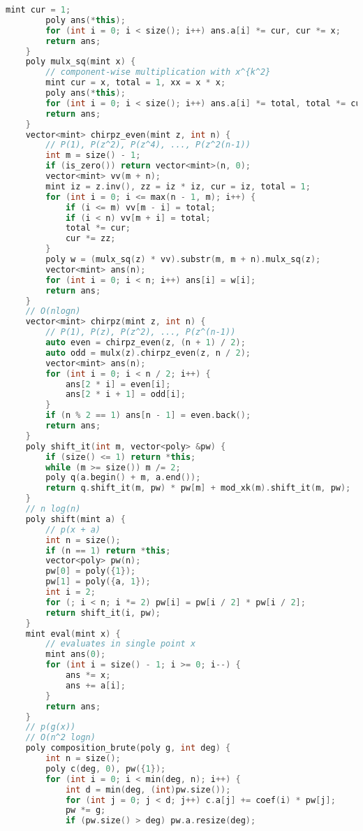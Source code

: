 \documentclass[10pt, a4paper, oneside]{book}
\begin{document}
\begin{lstlisting}[language=C++]
        mint cur = 1;
        poly ans(*this);
        for (int i = 0; i < size(); i++) ans.a[i] *= cur, cur *= x;
        return ans;
    }
    poly mulx_sq(mint x) {
        // component-wise multiplication with x^{k^2}
        mint cur = x, total = 1, xx = x * x;
        poly ans(*this);
        for (int i = 0; i < size(); i++) ans.a[i] *= total, total *= cur, cur *= xx;
        return ans;
    }
    vector<mint> chirpz_even(mint z, int n) {
        // P(1), P(z^2), P(z^4), ..., P(z^2(n-1))
        int m = size() - 1;
        if (is_zero()) return vector<mint>(n, 0);
        vector<mint> vv(m + n);
        mint iz = z.inv(), zz = iz * iz, cur = iz, total = 1;
        for (int i = 0; i <= max(n - 1, m); i++) {
            if (i <= m) vv[m - i] = total;
            if (i < n) vv[m + i] = total;
            total *= cur;
            cur *= zz;
        }
        poly w = (mulx_sq(z) * vv).substr(m, m + n).mulx_sq(z);
        vector<mint> ans(n);
        for (int i = 0; i < n; i++) ans[i] = w[i];
        return ans;
    }
    // O(nlogn)
    vector<mint> chirpz(mint z, int n) {
        // P(1), P(z), P(z^2), ..., P(z^(n-1))
        auto even = chirpz_even(z, (n + 1) / 2);
        auto odd = mulx(z).chirpz_even(z, n / 2);
        vector<mint> ans(n);
        for (int i = 0; i < n / 2; i++) {
            ans[2 * i] = even[i];
            ans[2 * i + 1] = odd[i];
        }
        if (n % 2 == 1) ans[n - 1] = even.back();
        return ans;
    }
    poly shift_it(int m, vector<poly> &pw) {
        if (size() <= 1) return *this;
        while (m >= size()) m /= 2;
        poly q(a.begin() + m, a.end());
        return q.shift_it(m, pw) * pw[m] + mod_xk(m).shift_it(m, pw);
    }
    // n log(n)
    poly shift(mint a) {
        // p(x + a)
        int n = size();
        if (n == 1) return *this;
        vector<poly> pw(n);
        pw[0] = poly({1});
        pw[1] = poly({a, 1});
        int i = 2;
        for (; i < n; i *= 2) pw[i] = pw[i / 2] * pw[i / 2];
        return shift_it(i, pw);
    }
    mint eval(mint x) {
        // evaluates in single point x
        mint ans(0);
        for (int i = size() - 1; i >= 0; i--) {
            ans *= x;
            ans += a[i];
        }
        return ans;
    }
    // p(g(x))
    // O(n^2 logn)
    poly composition_brute(poly g, int deg) {
        int n = size();
        poly c(deg, 0), pw({1});
        for (int i = 0; i < min(deg, n); i++) {
            int d = min(deg, (int)pw.size());
            for (int j = 0; j < d; j++) c.a[j] += coef(i) * pw[j];
            pw *= g;
            if (pw.size() > deg) pw.a.resize(deg);

\end{lstlisting}
\end{document}
